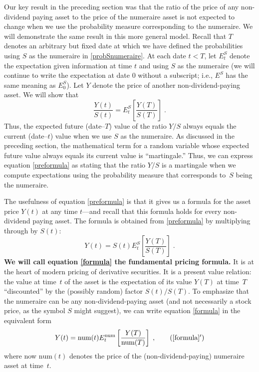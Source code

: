 Our key result in the preceding section was that the ratio of the price of any non-dividend paying asset to the price of the numeraire asset is not expected to change when we use the probability measure corresponding to the numeraire.  We will demonstrate the same result in this more general model.   Recall that $T$ denotes an arbitrary but fixed date at which we have defined the probabilities using $S$ as the numeraire in \eqref{probSnumeraire}.  At each date $t<T$, let $E^S_t$ denote the expectation given information at time $t$ and using $S$ as the numeraire (we will continue to write the expectation at date 0 without a subscript; i.e., $E^S$ has the same meaning as $E^S_0$).  Let $Y$ denote the price of another non-dividend-paying asset.  We will show that
\begin{equation}\label{preformula}
\frac{Y(t)}{S(t)} = E^S_t \left[\frac{Y(T)}{S(T)}\right]\;.
\end{equation}
Thus, the expected future (date--$T$) value of the ratio $Y/S$ always equals the current (date--$t$) value when we use $S$ as the numeraire.  As discussed in the preceding section, the mathematical term for a random variable whose expected future value always equals its current value is ``martingale.''  Thus, we can express equation \eqref{preformula} as stating that the ratio $Y/S$ is a martingale when we compute expectations using the probability measure that corresponds to~$S$ being the numeraire.

The usefulness of equation \eqref{preformula} is that it gives us a formula for the asset price $Y(t)$ at any time $t$---and recall that this formula holds for every non-dividend paying asset.  The formula is obtained from \eqref{preformula} by multiplying through by $S(t)$:
\begin{equation}\label{formula}
Y(t) = S(t)E^S_t \left[\frac{Y(T)}{S(T)}\right]\;.
\end{equation}
\textbf{We will call equation \eqref{formula} the fundamental pricing formula.} 
It is at the heart of modern pricing of derivative securities.  It is a present value relation: the value at time~$t$ of the asset is the expectation of its value $Y(T)$ at time~$T$ ``discounted'' by the (possibly random) factor $S(t)/S(T)$.  To emphasize that the numeraire can be any non-dividend-paying asset (and not necessarily a stock price, as the symbol $S$ might suggest), we can write equation \eqref{formula} in the equivalent form
\begin{equation}\label{formula10}
Y(t) = \text{num}(t)E^\text{num}_t \left[\frac{Y(T)}{\text{num}(T)}\right]\;,\tag{\ref{formula}$'$}
\end{equation}
where now $\text{num}(t)$ denotes the price of the (non-dividend-paying) numeraire asset at time~$t$.

